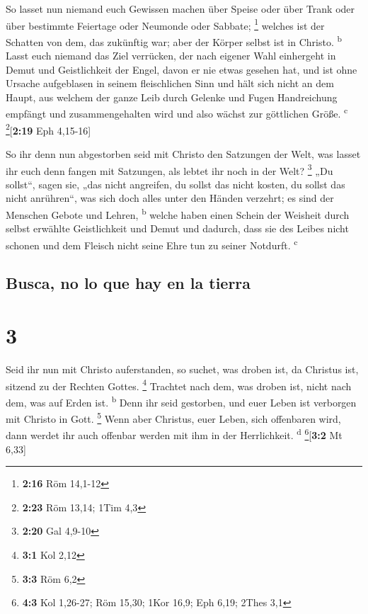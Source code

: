  So lasset nun niemand euch Gewissen machen über Speise
oder über Trank oder über bestimmte Feiertage oder Neumonde oder
Sabbate; \footnote{\textbf{2:16} Röm 14,1-12}  welches
ist der Schatten von dem, das zukünftig war; aber der Körper selbst ist
in Christo. \textsuperscript{b}  Lasst euch niemand das
Ziel verrücken, der nach eigener Wahl einhergeht in Demut und
Geistlichkeit der Engel, davon er nie etwas gesehen hat, und ist ohne
Ursache aufgeblasen in seinem fleischlichen Sinn  und
hält sich nicht an dem Haupt, aus welchem der ganze Leib durch Gelenke
und Fugen Handreichung empfängt und zusammengehalten wird und also
wächst zur göttlichen Größe. \textsuperscript{c}
\footnote{\textbf{2:23} Röm 13,14; 1Tim 4,3}{[}\textbf{2:19} Eph
4,15-16{]}

 So ihr denn nun abgestorben seid mit Christo den
Satzungen der Welt, was lasset ihr euch denn fangen mit Satzungen, als
lebtet ihr noch in der Welt? \footnote{\textbf{2:20} Gal 4,9-10}
 „Du sollst``, sagen sie, „das nicht angreifen, du sollst
das nicht kosten, du sollst das nicht anrühren``,  was
sich doch alles unter den Händen verzehrt; es sind der Menschen Gebote
und Lehren, \textsuperscript{b}  welche haben einen
Schein der Weisheit durch selbst erwählte Geistlichkeit und Demut und
dadurch, dass sie des Leibes nicht schonen und dem Fleisch nicht seine
Ehre tun zu seiner Notdurft. \textsuperscript{c}

\hypertarget{busca-no-lo-que-hay-en-la-tierra}{%
\subsection{Busca, no lo que hay en la
tierra}\label{busca-no-lo-que-hay-en-la-tierra}}

\hypertarget{section-2}{%
\section{3}\label{section-2}}

 Seid ihr nun mit Christo auferstanden, so suchet, was
droben ist, da Christus ist, sitzend zu der Rechten Gottes. \footnote{\textbf{3:1}
  Kol 2,12}  Trachtet nach dem, was droben ist, nicht nach
dem, was auf Erden ist. \textsuperscript{b}  Denn ihr seid
gestorben, und euer Leben ist verborgen mit Christo in Gott. \footnote{\textbf{3:3}
  Röm 6,2}  Wenn aber Christus, euer Leben, sich
offenbaren wird, dann werdet ihr auch offenbar werden mit ihm in der
Herrlichkeit. \textsuperscript{d} \footnote{\textbf{4:3} Kol 1,26-27;
  Röm 15,30; 1Kor 16,9; Eph 6,19; 2Thes 3,1}{[}\textbf{3:2} Mt 6,33{]}


